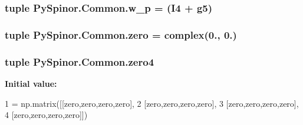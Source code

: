 \subsubsection[{w\+\_\+p}]{\setlength{\rightskip}{0pt plus 5cm}tuple Py\+Spinor.\+Common.\+w\+\_\+p = ({\bf I4} + {\bf g5})}\label{namespace_py_spinor_1_1_common_a50d86ef3514b190d72aa80914f0e880e}
\hypertarget{namespace_py_spinor_1_1_common_ab2c641a200d3164b1abc845b42e74c5a}{}
\subsubsection[{zero}]{\setlength{\rightskip}{0pt plus 5cm}tuple Py\+Spinor.\+Common.\+zero = complex(0., 0.)}\label{namespace_py_spinor_1_1_common_ab2c641a200d3164b1abc845b42e74c5a}
\hypertarget{namespace_py_spinor_1_1_common_a4f1daadf247aeea8d70a63d9a751f2d1}{}
\subsubsection[{zero4}]{\setlength{\rightskip}{0pt plus 5cm}tuple Py\+Spinor.\+Common.\+zero4}\label{namespace_py_spinor_1_1_common_a4f1daadf247aeea8d70a63d9a751f2d1}
{\bfseries Initial value\+:}
\begin{DoxyCode}
1 = np.matrix([[zero,zero,zero,zero],
2                [zero,zero,zero,zero],
3                [zero,zero,zero,zero],
4                [zero,zero,zero,zero]])
\end{DoxyCode}

